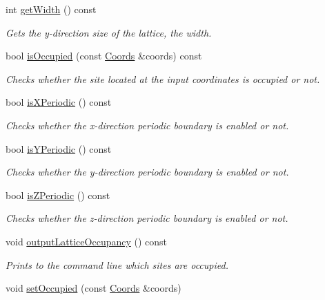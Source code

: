 \begin{DoxyCompactItemize}
int \hyperlink{class_lattice_aeb60d2b8bfb02d9da8bef463f0d41428}{get\+Width} () const
\begin{DoxyCompactList}\small\item\em Gets the y-\/direction size of the lattice, the width. \end{DoxyCompactList}\item 
bool \hyperlink{class_lattice_a4d37afb6ad4c67f4f6462c2f6d5c337d}{is\+Occupied} (const \hyperlink{struct_coords}{Coords} \&coords) const
\begin{DoxyCompactList}\small\item\em Checks whether the site located at the input coordinates is occupied or not. \end{DoxyCompactList}\item 
bool \hyperlink{class_lattice_accf3b995e0d0cb422907728a29b1b523}{is\+X\+Periodic} () const
\begin{DoxyCompactList}\small\item\em Checks whether the x-\/direction periodic boundary is enabled or not. \end{DoxyCompactList}\item 
bool \hyperlink{class_lattice_ac3192acefb019c5258143a6c758b3e48}{is\+Y\+Periodic} () const
\begin{DoxyCompactList}\small\item\em Checks whether the y-\/direction periodic boundary is enabled or not. \end{DoxyCompactList}\item 
bool \hyperlink{class_lattice_ad7dd1b12a253e506aba5cedb57bf86ea}{is\+Z\+Periodic} () const
\begin{DoxyCompactList}\small\item\em Checks whether the z-\/direction periodic boundary is enabled or not. \end{DoxyCompactList}\item 
\mbox{\label{class_lattice_aa1f65735ecbd750ec04b6413b4d47316}} 
void \hyperlink{class_lattice_aa1f65735ecbd750ec04b6413b4d47316}{output\+Lattice\+Occupancy} () const
\begin{DoxyCompactList}\small\item\em Prints to the command line which sites are occupied. \end{DoxyCompactList}\item 
void \hyperlink{class_lattice_a515b8bc548ef4a87c3495a7352a60399}{set\+Occupied} (const \hyperlink{struct_coords}{Coords} \&coords)

\end{DoxyCompactItemize}
